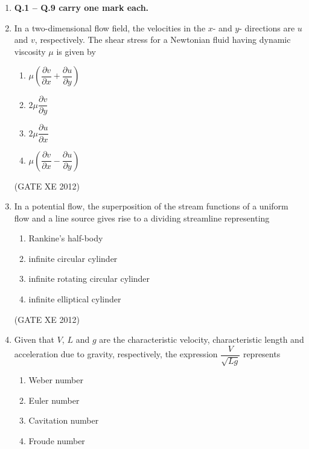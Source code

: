 \documentclass[12pt]{article}
\begin{document}
\begin{enumerate}

\item[] \textbf{Q.1 -- Q.9 carry one mark each.}


\item In a two-dimensional flow field, the velocities in the $x$- and $y$- directions are $u$ and $v$, respectively. The shear stress for a Newtonian fluid having dynamic viscosity $\mu$ is given by
\begin{multicols}{4}
\begin{enumerate}
\item $\mu \left( \dfrac{\partial v}{\partial x} + \dfrac{\partial u}{\partial y} \right)$
\item $2\mu \dfrac{\partial v}{\partial y}$
\item $2\mu \dfrac{\partial u}{\partial x}$
\item $\mu \left( \dfrac{\partial v}{\partial x} - \dfrac{\partial u}{\partial y} \right)$
\end{enumerate}
\end{multicols}

(GATE XE 2012)

\item In a potential flow, the superposition of the stream functions of a uniform flow and a line source gives rise to a dividing streamline representing
\begin{multicols}{2}
\begin{enumerate}
\item Rankine’s half-body
\item infinite circular cylinder
\item infinite rotating circular cylinder
\item infinite elliptical cylinder
\end{enumerate}
\end{multicols}

(GATE XE 2012)

\item Given that $V$, $L$ and $g$ are the characteristic velocity, characteristic length and acceleration due to gravity, respectively, the expression $\dfrac{V}{\sqrt{Lg}}$ represents
\begin{multicols}{4}
\begin{enumerate}
\item Weber number
\item Euler number
\item Cavitation number
\item Froude number
\end{enumerate}
\end{multicols}


\end{enumerate}
\end{document}
